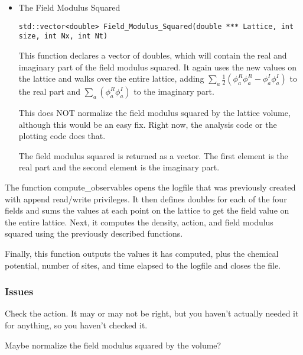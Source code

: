\documentclass[../../RotatingBosons.tex]{subfiles}
\begin{document}
\begin{itemize}
	\item The Field Modulus Squared
	
	\lstinline{std::vector<double> Field_Modulus_Squared(double *** Lattice, int size, int Nx, int Nt)}
	
	This function declares a vector of doubles, which will contain the real and imaginary part of the field modulus squared. It again uses the new values on the lattice and walks over the entire lattice, adding $\sum_{a}\frac{1}{2}(\phi_{a}^{R}\phi_{a}^{R} - \phi_{a}^{I}\phi_{a}^{I})$ to the real part and  $\sum_{a}(\phi_{a}^{R}\phi_{a}^{I})$ to the imaginary part.
	
	This does NOT normalize the field modulus squared by the lattice volume, although this would be an easy fix. Right now, the analysis code or the plotting code does that.
	
	The field modulus squared is returned as a vector. The first element is the real part and the second element is the imaginary part.
	
\end{itemize}

The function compute\_observables opens the logfile that was previously created with append read/write privileges. It then defines doubles for each of the four fields and sums the values at each point on the lattice to get the field value on the entire lattice. Next, it computes the density, action, and field modulus squared using the previously described functions.

Finally, this function outputs the values it has computed, plus the chemical potential, number of sites, and time elapsed to the logfile and closes the file.

\subsubsection{Issues}
Check the action. It may or may not be right, but you haven't actually needed it for anything, so you haven't checked it.

Maybe normalize the field modulus squared by the volume?
\end{document}

